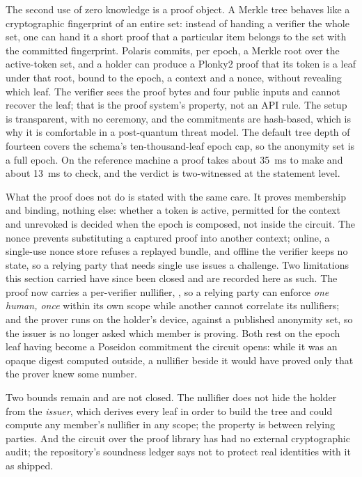 The second use of zero knowledge is a proof object. A Merkle tree behaves like a cryptographic
fingerprint of an entire set: instead of handing a verifier the whole set, one can hand it a short
proof that a particular item belongs to the set with the committed fingerprint. Polaris commits, per
epoch, a Merkle root over the active-token set, and a holder can produce a Plonky2 proof that its
token is a leaf under that root, bound to the epoch, a context and a nonce, without revealing which
leaf. The verifier sees the proof bytes and four public inputs and cannot recover the leaf; that is
the proof system's property, not an API rule. The setup is transparent, with no ceremony, and the
commitments are hash-based, which is why it is comfortable in a post-quantum threat model. The
default tree depth of fourteen covers the schema's ten-thousand-leaf epoch cap, so the anonymity set
is a full epoch. On the reference machine a proof takes about 35~ms to make and about 13~ms to
check, and the verdict is two-witnessed at the statement level. \sImpl

What the proof does not do is stated with the same care. It proves membership and binding, nothing
else: whether a token is active, permitted for the context and unrevoked is decided when the epoch is
composed, not inside the circuit. The nonce prevents substituting a captured proof into another
context; online, a single-use nonce store refuses a replayed bundle, and offline the verifier keeps no
state, so a relying party that needs single use issues a challenge. Two limitations this section
carried have since been closed and are recorded here as such. The proof now carries a per-verifier
nullifier, , so a relying party can enforce \emph{one
human, once} within its own scope while another cannot correlate its nullifiers; and the prover runs
on the holder's device, against a published anonymity set, so the issuer is no longer asked which
member is proving. Both rest on the epoch leaf having become a Poseidon commitment the circuit opens:
while it was an opaque digest computed outside, a nullifier beside it would have proved only that the
prover knew some number. \sImpl

Two bounds remain and are not closed. The nullifier does not hide the holder from the \emph{issuer},
which derives every leaf in order to build the tree and could compute any member's nullifier in any
scope; the property is between relying parties. And the circuit over the proof library has had no
external cryptographic audit; the repository's soundness ledger says not to protect real identities
with it as shipped. \sExt

